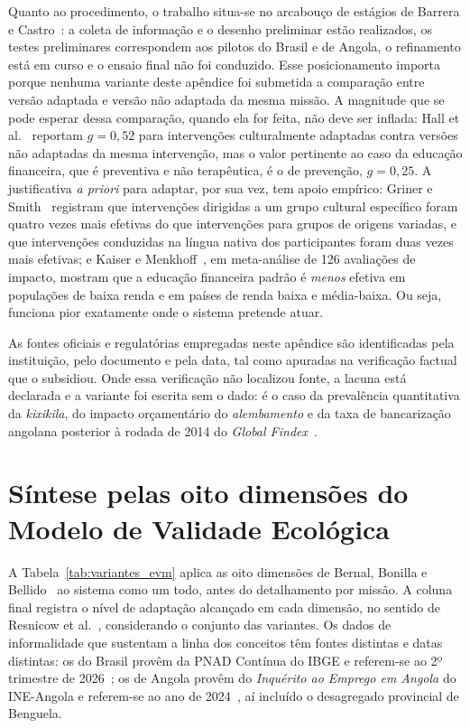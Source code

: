 Quanto ao procedimento, o trabalho situa-se no arcabouço de estágios de Barrera e Castro~\cite{barrera2006,barrera2013}: a coleta de informação e o desenho preliminar estão realizados, os testes preliminares correspondem aos pilotos do Brasil e de Angola, o refinamento está em curso e o ensaio final não foi conduzido. Esse posicionamento importa porque nenhuma variante deste apêndice foi submetida a comparação entre versão adaptada e versão não adaptada da mesma missão. A magnitude que se pode esperar dessa comparação, quando ela for feita, não deve ser inflada: Hall et al.~\cite{hall2016} reportam $g = 0{,}52$ para intervenções culturalmente adaptadas contra versões não adaptadas da mesma intervenção, mas o valor pertinente ao caso da educação financeira, que é preventiva e não terapêutica, é o de prevenção, $g = 0{,}25$. A justificativa \textit{a priori} para adaptar, por sua vez, tem apoio empírico: Griner e Smith~\cite{griner2006} registram que intervenções dirigidas a um grupo cultural específico foram quatro vezes mais efetivas do que intervenções para grupos de origens variadas, e que intervenções conduzidas na língua nativa dos participantes foram duas vezes mais efetivas; e Kaiser e Menkhoff~\cite{kaiser2017wber}, em meta-análise de 126 avaliações de impacto, mostram que a educação financeira padrão é \emph{menos} efetiva em populações de baixa renda e em países de renda baixa e média-baixa. Ou seja, funciona pior exatamente onde o sistema pretende atuar.

As fontes oficiais e regulatórias empregadas neste apêndice são identificadas pela instituição, pelo documento e pela data, tal como apuradas na verificação factual que o subsidiou. Onde essa verificação não localizou fonte, a lacuna está declarada e a variante foi escrita sem o dado: é o caso da prevalência quantitativa da \textit{kixikila}, do impacto orçamentário do \textit{alembamento} e da taxa de bancarização angolana posterior à rodada de 2014 do \textit{Global Findex}~\cite{worldbank2022}.

\section*{Síntese pelas oito dimensões do Modelo de Validade Ecológica}

A Tabela~\ref{tab:variantes_evm} aplica as oito dimensões de Bernal, Bonilla e Bellido~\cite{bernal1995} ao sistema como um todo, antes do detalhamento por missão. A coluna final registra o nível de adaptação alcançado em cada dimensão, no sentido de Resnicow et al.~\cite{resnicow1999}, considerando o conjunto das variantes. Os dados de informalidade que sustentam a linha dos conceitos têm fontes distintas e datas distintas: os do Brasil provêm da PNAD Contínua do IBGE e referem-se ao 2º trimestre de 2026~\cite{ibge2026pnad}; os de Angola provêm do \textit{Inquérito ao Emprego em Angola} do INE-Angola e referem-se ao ano de 2024~\cite{ineangola2024emprego}, aí incluído o desagregado provincial de Benguela.

